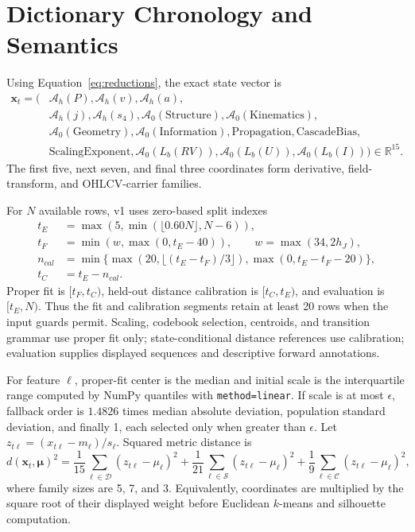 \documentclass{article}
\newcommand{\pressure}{P}
\newcommand{\R}{\mathbb{R}}
\begin{document}
\section{Dictionary Chronology and Semantics}
\label{app:dictionary}

Using Equation~\ref{eq:reductions}, the exact state vector is
\begin{align}
\mathbf x_t=(&\mathcal A_h(\pressure),\mathcal A_h(v),\mathcal A_h(a),\nonumber\\
&\mathcal A_h(j),\mathcal A_h(s_4),
\mathcal A_0(\mathrm{Structure}),\mathcal A_0(\mathrm{Kinematics}),\nonumber\\
&\mathcal A_0(\mathrm{Geometry}),\mathcal A_0(\mathrm{Information}),
\mathrm{Propagation},\mathrm{CascadeBias},\nonumber\\
&\mathrm{ScalingExponent},\mathcal A_0(L_b(RV)),
\mathcal A_0(L_b(U)),\mathcal A_0(L_b(I)))\in\R^{15}.
\label{eq:state-vector}
\end{align}
The first five, next seven, and final three coordinates form derivative, field-transform, and OHLCV-carrier families.

For $N$ available rows, v1 uses zero-based split indexes
\begin{align}
t_E&=\max(5,\min(\lfloor0.60N\rfloor,N-6)),\\
t_F&=\min(w,\max(0,t_E-40)),\qquad w=\max(34,2h_J),\\
n_{cal}&=\min\{\max(20,\lfloor(t_E-t_F)/3\rfloor),\max(0,t_E-t_F-20)\},\\
t_C&=t_E-n_{cal}.
\end{align}
Proper fit is $[t_F,t_C)$, held-out distance calibration is $[t_C,t_E)$, and evaluation is $[t_E,N)$. Thus the fit and calibration segments retain at least 20 rows when the input guards permit. Scaling, codebook selection, centroids, and transition grammar use proper fit only; state-conditional distance references use calibration; evaluation supplies displayed sequences and descriptive forward annotations.

For feature $\ell$, proper-fit center is the median and initial scale is the interquartile range computed by NumPy quantiles with \texttt{method=linear}. If scale is at most $\epsilon$, fallback order is $1.4826$ times median absolute deviation, population standard deviation, and finally 1, each selected only when greater than $\epsilon$. Let $z_{t\ell}=(x_{t\ell}-m_\ell)/s_\ell$. Squared metric distance is
\begin{equation}
d(\mathbf x_t,\boldsymbol\mu)^2=
\frac1{15}\sum_{\ell\in\mathcal D}(z_{t\ell}-\mu_\ell)^2+
\frac1{21}\sum_{\ell\in\mathcal S}(z_{t\ell}-\mu_\ell)^2+
\frac1{9}\sum_{\ell\in\mathcal C}(z_{t\ell}-\mu_\ell)^2,
\label{eq:metric}
\end{equation}
where family sizes are 5, 7, and 3. Equivalently, coordinates are multiplied by the square root of their displayed weight before Euclidean $k$-means and silhouette computation.
\end{document}
